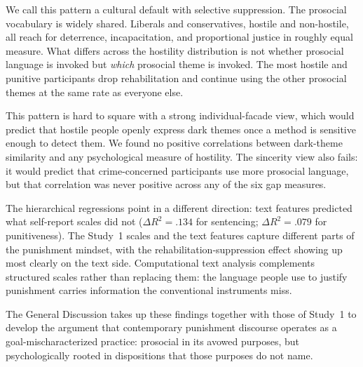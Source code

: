 We call this pattern a cultural default with selective suppression. The prosocial vocabulary is widely shared. Liberals and conservatives, hostile and non-hostile, all reach for deterrence, incapacitation, and proportional justice in roughly equal measure. What differs across the hostility distribution is not whether prosocial language is invoked but \textit{which} prosocial theme is invoked. The most hostile and punitive participants drop rehabilitation and continue using the other prosocial themes at the same rate as everyone else.

This pattern is hard to square with a strong individual-facade view, which would predict that hostile people openly express dark themes once a method is sensitive enough to detect them. We found no positive correlations between dark-theme similarity and any psychological measure of hostility. The sincerity view also fails: it would predict that crime-concerned participants use more prosocial language, but that correlation was never positive across any of the six gap measures.

The hierarchical regressions point in a different direction: text features predicted what self-report scales did not ($\Delta R^2 = .134$ for sentencing; $\Delta R^2 = .079$ for punitiveness). The Study~1 scales and the text features capture different parts of the punishment mindset, with the rehabilitation-suppression effect showing up most clearly on the text side. Computational text analysis complements structured scales rather than replacing them: the language people use to justify punishment carries information the conventional instruments miss.

The General Discussion takes up these findings together with those of Study~1 to develop the argument that contemporary punishment discourse operates as a goal-mischaracterized practice: prosocial in its avowed purposes, but psychologically rooted in dispositions that those purposes do not name.

